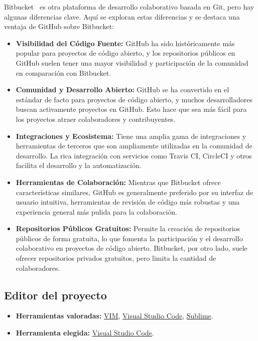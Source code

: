 Bitbucket~\cite{misc:Bitbucket} es otra plataforma de desarrollo colaborativo basada en Git, pero hay algunas diferencias clave. Aquí se exploran estas diferencias y se destaca una ventaja de GitHub sobre Bitbucket:

\begin{itemize}
	\item \textbf{Visibilidad del Código Fuente:}
		GitHub ha sido históricamente más popular para proyectos de código abierto, y los repositorios públicos en GitHub suelen tener una mayor visibilidad y participación de la comunidad en comparación con Bitbucket.

\item \textbf{Comunidad y Desarrollo Abierto:}
GitHub se ha convertido en el estándar de facto para proyectos de código abierto, y muchos desarrolladores buscan activamente proyectos en GitHub. Esto hace que sea más fácil para los proyectos atraer colaboradores y contribuyentes.

\item \textbf{Integraciones y Ecosistema:}
Tiene una amplia gama de integraciones y herramientas de terceros que son ampliamente utilizadas en la comunidad de desarrollo. La rica integración con servicios como Travis CI, CircleCI y otros facilita el desarrollo y la automatización.

\item \textbf{Herramientas de Colaboración:}
Mientras que Bitbucket ofrece características similares, GitHub es generalmente preferido por su interfaz de usuario intuitiva, herramientas de revisión de código más robustas y una experiencia general más pulida para la colaboración.

\item \textbf{Repositorios Públicos Gratuitos:}
Permite la creación de repositorios públicos de forma gratuita, lo que fomenta la participación y el desarrollo colaborativo en proyectos de código abierto. Bitbucket, por otro lado, suele ofrecer repositorios privados gratuitos, pero limita la cantidad de colaboradores.
\end{itemize}


\subsection{Editor del proyecto}
\begin{itemize}
    \item \textbf{Herramientas valoradas:} \href{https://www.vim.org/}{VIM}, \href{https://code.visualstudio.com/}{Visual Studio Code}, \href{https://www.sublimetext.com/}{Sublime}.
    \item \textbf{Herramienta elegida:} \href{https://code.visualstudio.com/}{Visual Studio Code}.
\end{itemize}


